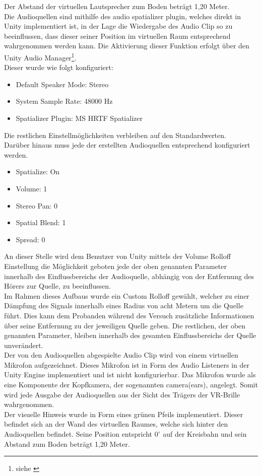 Der Abstand der virtuellen Lautsprecher zum Boden beträgt 1,20 Meter. \\
Die Audioquellen sind mithilfe des audio spatializer plugin, welches direkt in Unity implementiert ist, in der Lage die Wiedergabe des Audio Clip so zu beeinflussen, dass dieser seiner Position im virtuellen Raum entsprechend wahrgenommen werden kann. Die Aktivierung dieser Funktion erfolgt über den Unity Audio Manager\footnote{siehe \cite{Spatial}}.\\
Dieser wurde wie folgt konfiguriert:
\begin{itemize}
\item Default Speaker Mode: Stereo
\item System Sample Rate: 48000 Hz
\item Spatializer Plugin: MS HRTF Spatializer
\end{itemize}
Die restlichen Einstellmöglichkeiten verbleiben auf den Standardwerten.\\
Darüber hinaus muss jede der erstellten Audioquellen entsprechend konfiguriert werden.
\begin{itemize}
\item Spatialize: On
\item Volume: 1
\item Stereo Pan: 0
\item Spatial Blend: 1
\item Spread: 0
\end{itemize}
An dieser Stelle wird dem Benutzer von Unity mittels der Volume Rolloff Einstellung die Möglichkeit geboten jede der oben genannten Parameter innerhalb des Einflussbereichs der Audioquelle, abhängig von der Entfernung des Hörers zur Quelle, zu beeinflussen.\\
Im Rahmen dieses Aufbaus wurde ein Custom Rolloff gewählt, welcher zu einer Dämpfung des Signals innerhalb eines Radius von acht Metern um die Quelle führt. Dies kann dem Probanden während des Versuch zusätzliche Informationen über seine Entfernung zu der jeweiligen Quelle geben. Die restlichen, der oben genannten Parameter, bleiben innerhalb des gesamten Einflussbereichs der Quelle unverändert.\\
Der von den Audioquellen abgespielte Audio Clip wird von einem virtuellen Mikrofon aufgezeichnet. Dieses Mikrofon ist in Form des Audio Listeners in der Unity Engine implementiert und ist nicht konfigurierbar. Das Mikrofon wurde als eine Komponente der Kopfkamera, der sogenannten camera(ears), angelegt. Somit wird jede Ausgabe der Audioquellen aus der Sicht des Trägers der VR-Brille wahrgenommen.\\
Der visuelle Hinweis wurde in Form eines grünen Pfeils implementiert. Dieser befindet sich an der Wand des virtuellen Raumes, welche sich hinter den Audioquellen befindet. Seine Position entspricht $0^{\circ}$ auf der Kreisbahn und sein Abstand zum Boden beträgt 1,20 Meter.

